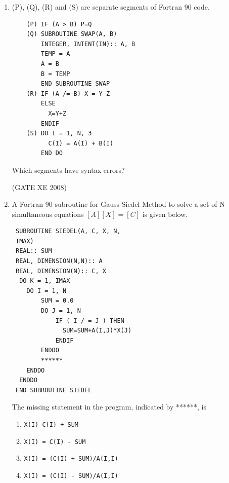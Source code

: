 \documentclass[12pt]{article}
\begin{document}
\begin{enumerate}
\begin{table}[H]
\begin{tabular}{ll}
\end{tabular} \end{table}

(GATE XE 2008)
\item (P), (Q), (R) and (S) are separate segments of Fortran 90 code.
\begin{verbatim}
    (P) IF (A > B) P=Q
    (Q) SUBROUTINE SWAP(A, B)
        INTEGER, INTENT(IN):: A, B
        TEMP = A
        A = B
        B = TEMP
        END SUBROUTINE SWAP
    (R) IF (A /= B) X = Y-Z
        ELSE
          X=Y+Z
        ENDIF
    (S) DO I = 1, N, 3
          C(I) = A(I) + B(I)
        END DO
\end{verbatim}

Which segments have syntax errors?

\begin{enumerate}
\end{enumerate}

(GATE XE 2008)
\item A Fortran-90 subroutine for Gauss-Siedel Method to solve a set of N simultaneous equations $[A][X]=[C]$ is given below.
\begin{verbatim}
 SUBROUTINE SIEDEL(A, C, X, N,
 IMAX)
 REAL:: SUM
 REAL, DIMENSION(N,N):: A
 REAL, DIMENSION(N):: C, X
  DO K = 1, IMAX
    DO I = 1, N
        SUM = 0.0
        DO J = 1, N
            IF ( I / = J ) THEN
              SUM=SUM+A(I,J)*X(J)
            ENDIF
        ENDDO
        ******
    ENDDO
  ENDDO
 END SUBROUTINE SIEDEL
\end{verbatim}

The missing statement in the program, indicated by ******, is

\begin{enumerate}
\item  \texttt{X(I) C(I) + SUM}

\item  \texttt{X(I) = C(I) - SUM}

\item  \texttt{X(I) = (C(I) + SUM)/A(I,I)}

\item  \texttt{X(I) = (C(I) - SUM)/A(I,I)}
\end{enumerate}


\end{enumerate}
\end{document}
